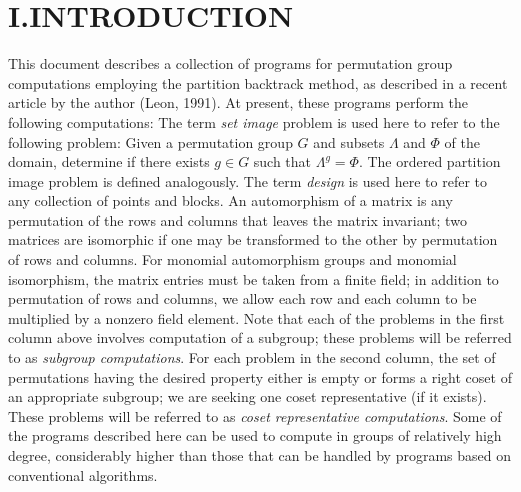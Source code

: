 \section{I.\quad INTRODUCTION}
%
This document describes a collection of programs for permutation group
computations employing the partition backtrack method, as described in a
recent article by the author (Leon, 1991).  At present, these programs
perform the following computations:
\medskip
{}
\vskip4pt
\vskip4pt
\vskip4pt
\vskip4pt
\vskip4pt
\vskip4pt
\vskip4pt
\vskip-1.5pt
\vskip4pt
\medbreak
The term {\it set image} problem is used here to refer to the following
problem: Given a permutation group
$G$ and subsets $\Lambda$ and $\Phi$ of the domain, determine if there exists
$g \in G$ such that $\Lambda^g = \Phi$.  The ordered partition image problem is
defined analogously.  The term {\it design\/} is used here to refer to any
collection of points and blocks.  An automorphism of a matrix is any permutation
of the rows and columns that leaves the matrix invariant; two matrices are
isomorphic if one may be transformed to the other by permutation of rows and
columns.  For monomial automorphism groups and monomial isomorphism, the matrix entries
must be taken from a finite field; in addition to permutation of rows and
columns, we allow each row and each column to be multiplied by a nonzero
field element.
%
\medbreak
Note that each of the problems in the first column above involves
computation of a subgroup; these problems will be referred to
as {\it subgroup computations}.  For each problem
in the second column, the set of permutations having the desired property
either is empty or forms a right coset of an appropriate subgroup; we are
seeking one coset representative (if it exists).  These problems
will be referred to as {\it coset representative computations}.
%
\medbreak
Some of the programs described here can be used to compute in groups of
relatively high degree, considerably higher than those that can be
handled by programs based on conventional algorithms.
